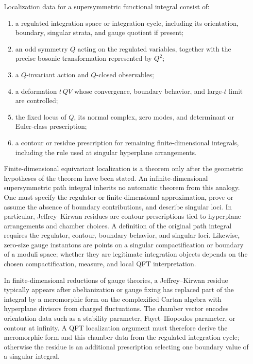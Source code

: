 \begin{definition}
\label{def:susy-localization-data}
Localization data for a supersymmetric functional integral consist of:
\begin{enumerate}[label=(\roman*)]
\item a regulated integration space or integration cycle, including its
orientation, boundary, singular strata, and gauge quotient if present;
\item an odd symmetry \(Q\) acting on the regulated variables, together with
the precise bosonic transformation represented by \(Q^2\);
\item a \(Q\)-invariant action and \(Q\)-closed observables;
\item a deformation \(t\,Q V\) whose convergence, boundary behavior, and
large-\(t\) limit are controlled;
\item the fixed locus of \(Q\), its normal complex, zero modes, and determinant
or Euler-class prescription;
\item a contour or residue prescription for remaining finite-dimensional
integrals, including the rule used at singular hyperplane arrangements.
\end{enumerate}
\end{definition}

Finite-dimensional equivariant localization is a theorem only after the
geometric hypotheses of the theorem have been stated.  An infinite-dimensional
supersymmetric path integral inherits no automatic theorem from this analogy.
One must specify the regulator or finite-dimensional approximation, prove or
assume the absence of boundary contributions, and describe singular loci.  In
particular, Jeffrey--Kirwan residues are contour prescriptions tied to
hyperplane arrangements and chamber choices.  A definition of the original
path integral requires the regulator, contour, boundary behavior, and singular
loci.  Likewise, zero-size gauge instantons are points on a singular
compactification or boundary of a moduli space; whether they are legitimate
integration objects depends on the chosen compactification, measure, and local
QFT interpretation.

In finite-dimensional reductions of gauge theories, a Jeffrey--Kirwan residue
typically appears after abelianization or gauge fixing has replaced part of
the integral by a meromorphic form on the complexified Cartan algebra with
hyperplane divisors from charged fluctuations.  The chamber vector encodes
orientation data such as a stability parameter, Fayet--Iliopoulos parameter,
or contour at infinity.  A QFT localization argument must therefore derive the
meromorphic form and this chamber data from the regulated integration cycle;
otherwise the residue is an additional prescription selecting one boundary
value of a singular integral.


